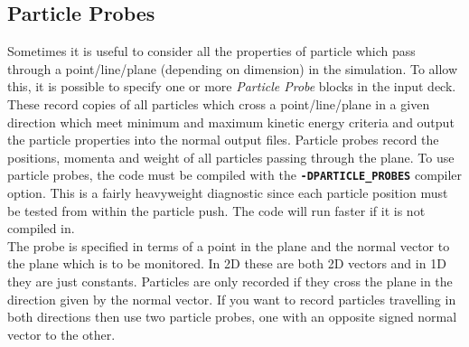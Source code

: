 \documentclass[12pt,a4paper]{article}
\newcommand{\inlinecode}[1]{{\color{warwickred} \bf\texttt{#1}}}
\begin{document}
\subsection{Particle Probes}
Sometimes it is useful to consider all the properties of particle which pass
through a point/line/plane (depending on dimension) in the simulation. To
allow this, it is possible to specify one or more {\it Particle Probe} blocks
in the input deck. These record copies of all particles which cross a
point/line/plane in a given direction which meet minimum and maximum kinetic
energy criteria and output the particle properties into the normal output
files. Particle probes record the positions, momenta and weight of all
particles passing through the plane. To use particle probes, the code must be
compiled with the \inlinecode{-DPARTICLE\_PROBES} compiler option. This is
a fairly heavyweight diagnostic since each particle position must be tested
from within the particle push. The code will run faster if it is not compiled
in.\\

The probe is specified in terms of a point in the plane and the normal
vector to the plane which is to be monitored. In 2D these are both 2D
vectors and in 1D they are just constants. Particles are only recorded
if they cross the plane in the direction given by the normal vector.
If you want to record particles travelling in both directions then use two
particle probes, one with an opposite signed normal vector to the other.
\end{document}
